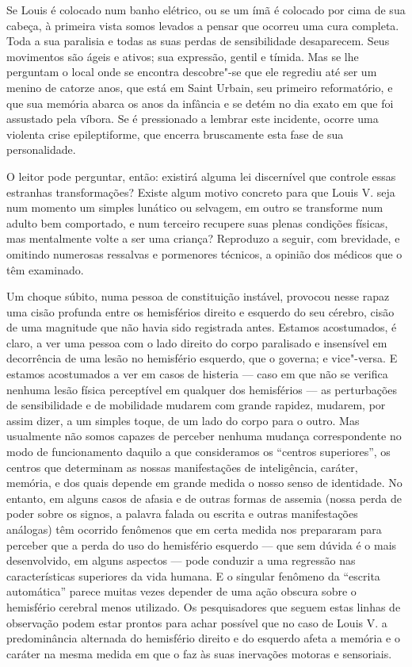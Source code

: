 Se Louis é colocado num banho elétrico, ou se um ímã é colocado por cima
de sua cabeça, à primeira vista somos levados a pensar que ocorreu uma
cura completa.  Toda a sua paralisia e todas as suas perdas de
sensibilidade desaparecem.  Seus movimentos são ágeis e ativos; sua
expressão, gentil e tímida.  Mas se lhe perguntam o local onde se
encontra descobre"-se que ele regrediu até ser um menino de catorze
anos, que está em Saint Urbain, seu primeiro reformatório, e que sua
memória abarca os anos da infância e se detém no dia exato em que foi
assustado pela víbora. Se é pressionado a lembrar este incidente,
ocorre uma violenta crise epileptiforme, que encerra bruscamente esta
fase de sua personalidade.

O leitor pode perguntar, então: existirá alguma lei discernível que
controle essas estranhas transformações?  Existe algum motivo concreto
para que Louis V. seja num momento um simples lunático ou selvagem, em
outro se transforme num adulto bem comportado, e num terceiro recupere
suas plenas condições físicas, mas mentalmente volte a ser uma criança?
 Reproduzo a seguir, com brevidade, e omitindo numerosas ressalvas e
pormenores técnicos, a opinião dos médicos que o têm examinado.

Um choque súbito, numa pessoa de constituição instável, provocou nesse
rapaz uma cisão profunda entre os hemisférios direito e esquerdo do seu
cérebro, cisão de uma magnitude que não havia sido registrada antes. 
Estamos acostumados, é claro, a ver uma pessoa com o lado direito do
corpo paralisado e insensível em decorrência de uma lesão no hemisfério
esquerdo, que o governa; e vice"-versa.  E estamos acostumados a ver em
casos de histeria --- caso em que não se verifica nenhuma lesão física
perceptível em qualquer dos hemisférios --- as perturbações de
sensibilidade e de mobilidade mudarem com grande rapidez, mudarem, por
assim dizer, a um simples toque, de um lado do corpo para o outro.  Mas
usualmente não somos capazes de perceber nenhuma mudança correspondente
no modo de funcionamento daquilo a que consideramos os “centros
superiores”, os centros que determinam as nossas manifestações de
inteligência, caráter, memória, e dos quais depende em grande medida o
nosso senso de identidade.  No entanto, em alguns casos de afasia e de
outras formas de assemia (nossa perda de poder sobre os signos, a
palavra falada ou escrita e outras manifestações análogas) têm ocorrido
fenômenos que em certa medida nos prepararam para perceber que a perda
do uso do hemisfério esquerdo --- que sem dúvida é o mais desenvolvido,
em alguns aspectos --- pode conduzir a uma regressão nas características
superiores da vida humana.  E o singular fenômeno da “escrita
automática” parece muitas vezes depender de uma ação obscura sobre o
hemisfério cerebral menos utilizado.  Os pesquisadores que seguem estas
linhas de observação podem estar prontos para achar possível que no
caso de Louis V. a predominância alternada do hemisfério direito e do
esquerdo afeta a memória e o caráter na mesma medida em que o faz às
suas inervações motoras e sensoriais.  

